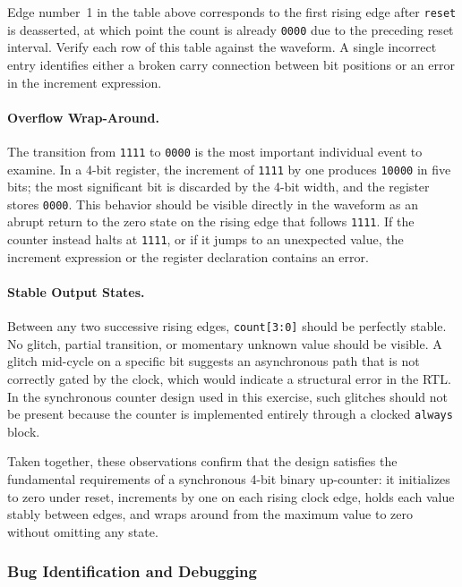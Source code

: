 Edge number~1 in the table above corresponds to the first rising edge after
\texttt{reset} is deasserted, at which point the count is already
\texttt{0000} due to the preceding reset interval. Verify each row of this
table against the waveform. A single incorrect entry identifies either a
broken carry connection between bit positions or an error in the increment
expression.

\paragraph{Overflow Wrap-Around.}
The transition from \texttt{1111} to \texttt{0000} is the most important
individual event to examine. In a 4-bit register, the increment of
\texttt{1111} by one produces \texttt{10000} in five bits; the most
significant bit is discarded by the 4-bit width, and the register stores
\texttt{0000}. This behavior should be visible directly in the waveform as
an abrupt return to the zero state on the rising edge that follows
\texttt{1111}. If the counter instead halts at \texttt{1111}, or if it
jumps to an unexpected value, the increment expression or the register
declaration contains an error.

\paragraph{Stable Output States.}
Between any two successive rising edges, \texttt{count[3:0]} should be
perfectly stable. No glitch, partial transition, or momentary unknown value
should be visible. A glitch mid-cycle on a specific bit suggests an
asynchronous path that is not correctly gated by the clock, which would
indicate a structural error in the RTL. In the synchronous counter design
used in this exercise, such glitches should not be present because the
counter is implemented entirely through a clocked \texttt{always} block.

Taken together, these observations confirm that the design satisfies the
fundamental requirements of a synchronous 4-bit binary up-counter: it
initializes to zero under reset, increments by one on each rising clock edge,
holds each value stably between edges, and wraps around from the maximum
value to zero without omitting any state.

\subsubsection{Bug Identification and Debugging}
\label{sec:sim-lab-debug}

